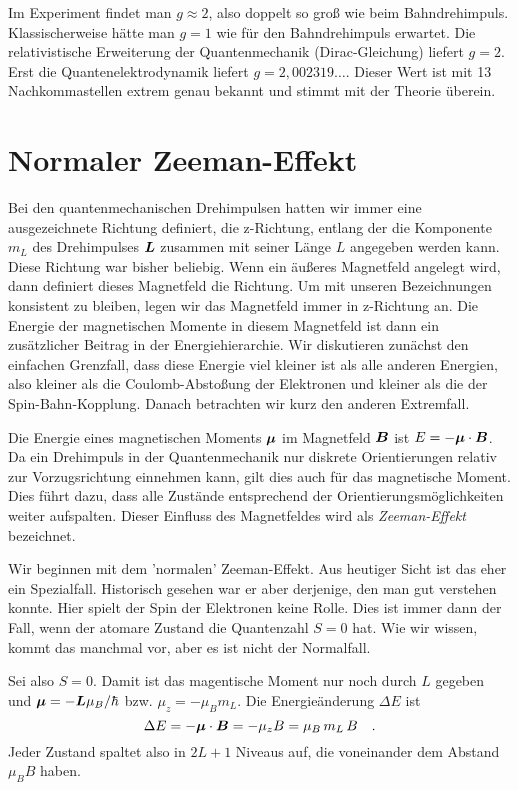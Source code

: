Im Experiment findet man $g \approx 2$, also doppelt so groß wie beim Bahndrehimpuls. Klassischerweise hätte man $g=1$ wie für den Bahndrehimpuls erwartet. Die relativistische Erweiterung der Quantenmechanik (Dirac-Gleichung) liefert $g=2$. Erst die Quantenelektrodynamik liefert $g=2,002319\dots$. Dieser Wert ist mit 13 Nachkommastellen extrem genau bekannt und stimmt mit der Theorie überein.


\section{Normaler Zeeman-Effekt}

Bei den quantenmechanischen Drehimpulsen hatten wir immer eine ausgezeichnete Richtung definiert, die z-Richtung, entlang der die Komponente $m_L$ des Drehimpulses $\boldsymbol{L}$ zusammen mit seiner Länge $L$ angegeben werden kann. Diese Richtung war bisher beliebig. Wenn ein äußeres Magnetfeld angelegt wird, dann definiert dieses Magnetfeld die Richtung. Um mit unseren Bezeichnungen konsistent zu bleiben, legen wir das Magnetfeld immer in z-Richtung an. Die Energie der magnetischen Momente in diesem Magnetfeld ist dann ein zusätzlicher Beitrag in der Energiehierarchie. Wir diskutieren zunächst den einfachen Grenzfall, dass diese Energie viel kleiner ist als alle anderen Energien, also kleiner als die Coulomb-Abstoßung  der Elektronen und kleiner als die der Spin-Bahn-Kopplung. Danach betrachten wir kurz den anderen Extremfall.

Die Energie eines magnetischen Moments $\boldsymbol{\mu}$ im Magnetfeld $\boldsymbol{B}$ ist $E = - \boldsymbol{\mu} \cdot \boldsymbol{B}$. Da ein Drehimpuls in der Quantenmechanik nur diskrete Orientierungen relativ zur Vorzugsrichtung einnehmen kann, gilt dies auch für das magnetische Moment. Dies führt dazu, dass alle Zustände entsprechend der Orientierungsmöglichkeiten weiter aufspalten. Dieser Einfluss des Magnetfeldes wird als \emph{Zeeman-Effekt} bezeichnet. 

Wir beginnen mit dem 'normalen' Zeeman-Effekt. Aus heutiger Sicht ist das eher ein Spezialfall. Historisch gesehen war er aber derjenige, den man gut verstehen konnte. Hier spielt der Spin der Elektronen keine Rolle. Dies ist immer dann der Fall, wenn der atomare Zustand die Quantenzahl $S=0$ hat. Wie wir wissen, kommt das manchmal vor, aber es ist nicht der Normalfall.

Sei also $S=0$. Damit ist das magentische Moment nur noch durch $L$ gegeben und $\boldsymbol{\mu} = - \boldsymbol{L} \mu_B / \hbar$ bzw. $\mu_z = - \mu_B  m_L$. Die Energieänderung $\Delta E$ ist
\begin{equation}
    \Delta E = - \boldsymbol{\mu} \cdot \boldsymbol{B} =- \mu_z B =  \mu_B \, m_L \, B  \quad .
\end{equation}
Jeder Zustand spaltet also in $2L + 1$ Niveaus auf, die voneinander dem Abstand $\mu_B B$ haben.

